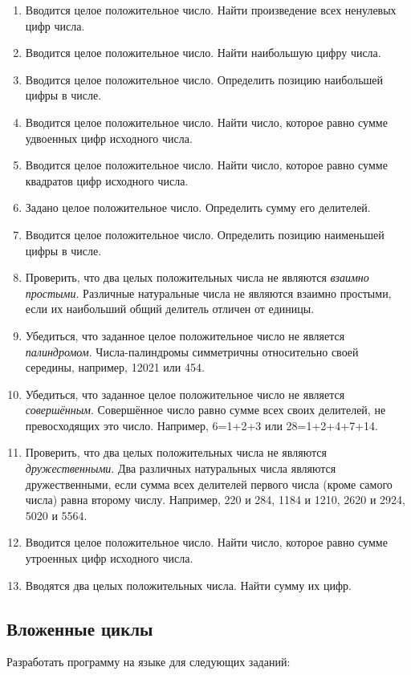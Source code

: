 \begin{enumerate}
\item Вводится целое положительное число. Найти произведение всех ненулевых цифр числа.
\item Вводится целое положительное число. Найти наибольшую цифру числа.
\item Вводится целое положительное число. Определить позицию наибольшей цифры в числе.
\item Вводится целое положительное число. Найти число, которое равно сумме удвоенных цифр исходного числа.
\item Вводится целое положительное число. Найти число, которое равно сумме квадратов цифр исходного числа.
\item Задано целое положительное число. Определить сумму его делителей.
\item Вводится целое положительное число. Определить позицию наименьшей цифры в числе.
\item Проверить, что два целых положительных числа не являются \emph{взаимно простыми}. Различные
натуральные числа не являются взаимно простыми, если их наибольший общий делитель отличен от единицы.
\item Убедиться, что заданное целое положительное число не является \emph{палиндромом}. Числа-палиндромы
симметричны относительно своей середины, например, 12021 или 454.
\item Убедиться, что заданное целое положительное число не является \emph{совершённым}. Совершённое число
равно сумме всех своих делителей, не превосходящих это число. Например, 6=1+2+3 или 28=1+2+4+7+14.
\item Проверить, что два целых положительных числа не являются \emph{дружественными}. Два различных
натуральных числа являются дружественными, если сумма всех делителей первого числа (кроме самого числа) равна второму
числу. Например, 220 и 284, 1184 и 1210, 2620 и 2924, 5020 и 5564.
\item Вводится целое положительное число. Найти число, которое равно сумме утроенных цифр исходного числа.
\item Вводятся два целых положительных числа. Найти сумму их цифр. 
\end{enumerate}

\subsection[Вложенные циклы]{Вложенные циклы}
Разработать программу на языке  для следующих заданий:

